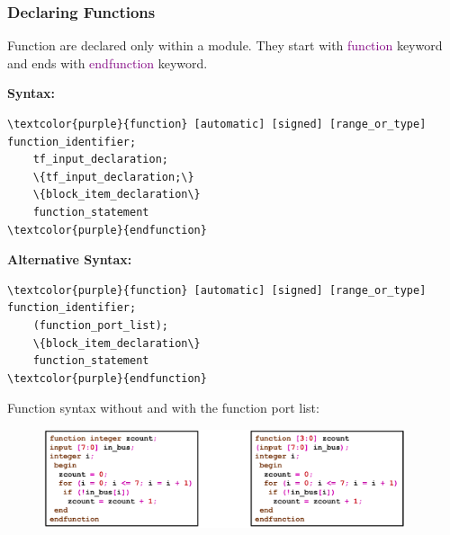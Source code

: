 \documentclass[t, notes, xcolor=table]{beamer}
\begin{document}
\begin{frame}[fragile]
\frametitle{Declaring Functions}
\scriptsize{
Function are declared only within a module. They start with \textcolor{purple}{function} keyword and ends with \textcolor{purple}{endfunction} keyword.
\newline

\textbf{Syntax:}
}
\tiny{
\begin{Verbatim}[commandchars=\\\{\}, tabsize=2]
\textcolor{purple}{function} [automatic] [signed] [range_or_type] function_identifier;
	tf_input_declaration;
	\{tf_input_declaration;\}
	\{block_item_declaration\}
	function_statement
\textcolor{purple}{endfunction}
\end{Verbatim}
}
\scriptsize{
\textbf{Alternative Syntax:}
}
\tiny{
\begin{Verbatim}[commandchars=\\\{\}, tabsize=2]
\textcolor{purple}{function} [automatic] [signed] [range_or_type] function_identifier;
	(function_port_list);
	\{block_item_declaration\}
	function_statement
\textcolor{purple}{endfunction}
\end{Verbatim}
}
\scriptsize{

\vfill
Function syntax without and with the function port list:
}
\begin{figure}
    \includegraphics[width=0.95\textwidth]{img/10_function.png}
\end{figure}

\end{frame}
\end{document}
